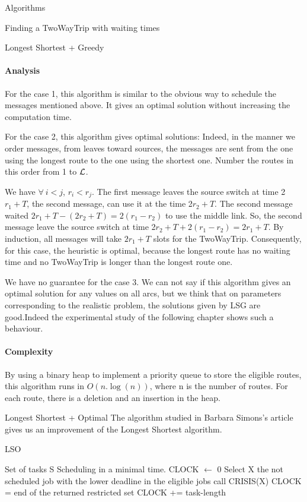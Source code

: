 \documentclass[a4paper,10pt]{report}
\begin{document}
\begin{chapter}{Algorithms}
\begin{section}{Finding a TwoWayTrip with waiting times}
\begin{subsection}{Longest Shortest + Greedy}
\paragraph{Analysis}
For the case 1, this algorithm is similar to the obvious way to schedule the messages mentioned above. It gives an optimal solution without increasing 
the computation time.

For the case 2, this algorithm gives optimal solutions: Indeed, in the manner we order messages, from leaves toward sources,
the messages are sent from the one using the longest route to the one using the shortest one. Number the routes in this order from 1 to ${\cal L}$.

We have $\forall \ i<j$, $r_i<r_j$.
The first message leaves the source switch at time 2$r_1+T$, the second message, can use it at the time 2$r_2+T$.
The second message waited $2r_1+T-(2r_2+T) = 2(r_1-r_2)$ to use the middle link. So, the second message leave the source switch at time
2$r_2+T + 2(r_1-r_2) = 2r_1 +T$.
By induction, all messages will take $2r_1 +T$ slots for the TwoWayTrip.
Consequently, for this case, the heuristic is optimal, because the longest route has no waiting time and no TwoWayTrip is longer than the longest route one.

We have no guarantee for the case 3. We can not say if this algorithm gives an optimal solution for any values on all arcs, but we think that on parameters corresponding to the realistic problem, the solutions given by LSG are good.Indeed the experimental study of the following chapter shows such a behaviour.

\paragraph{Complexity}
By using a binary heap to implement a priority queue to store the eligible routes, this algorithm runs in $O(n.\log(n))$, 
where n is the number of routes. For each route, there is a deletion and an insertion in the heap.
\end{subsection}

\begin{subsection}{Longest Shortest + Optimal}
 The algorithm studied in Barbara Simons's article \cite{simons1978fast} gives us an improvement of the Longest Shortest algorithm.
 \begin{algorithm}[H]
\caption{LSO}
\begin{algorithmic}
\REQUIRE Set of tasks S
\ENSURE Scheduling in a minimal time.
\STATE CLOCK $\leftarrow$ 0
\STATE Select X the not scheduled job with the lower deadline in the eligible jobs
\STATE call CRISIS(X)
\STATE CLOCK = end of the returned restricted set
\ELSE
\STATE CLOCK += task-length
\ENDIF


\end{algorithmic}
\end{algorithm}
\end{subsection}
\end{section}
\end{chapter}
\end{document}
